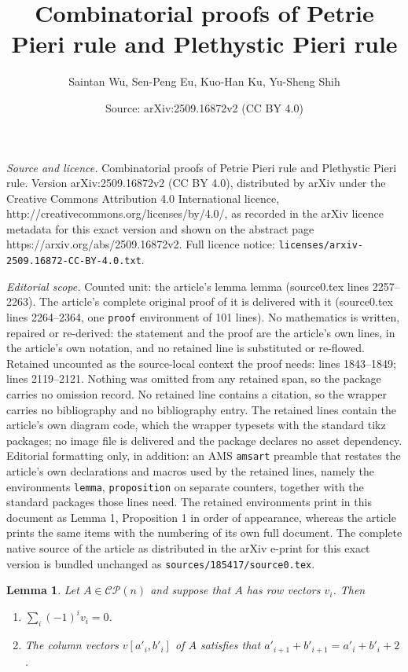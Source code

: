 \documentclass[10pt,a4paper]{amsart}
\title{Combinatorial proofs of Petrie Pieri rule and Plethystic Pieri rule}
\author{Saintan Wu, Sen-Peng Eu, Kuo-Han Ku, Yu-Sheng Shih}
\date{Source: arXiv:2509.16872v2 (CC BY 4.0)}
\newtheorem{lemma}{Lemma}
\begin{document}
\maketitle

\noindent\emph{Source and licence.} Combinatorial proofs of Petrie Pieri rule and Plethystic Pieri rule. Version arXiv:2509.16872v2 (CC BY 4.0), distributed by arXiv under the Creative Commons Attribution 4.0 International licence, http://creativecommons.org/licenses/by/4.0/, as recorded in the arXiv licence metadata for this exact version and shown on the abstract page https://arxiv.org/abs/2509.16872v2. Full licence notice: \texttt{licenses/arxiv-2509.16872-CC-BY-4.0.txt}.\par\smallskip

\noindent\textit{Editorial scope.} Counted unit: the article's lemma lemma (source0.tex lines 2257--2263). The article's complete original proof of it is delivered with it (source0.tex lines 2264--2364, one \texttt{proof} environment of 101 lines). No mathematics is written, repaired or re-derived: the statement and the proof are the article's own lines, in the article's own notation, and no retained line is substituted or re-flowed.  Retained uncounted as the source-local context the proof needs: lines 1843--1849; lines 2119--2121.  Nothing was omitted from any retained span, so the package carries no omission record.  No retained line contains a citation, so the wrapper carries no bibliography and no bibliography entry.  The retained lines contain the article's own diagram code, which the wrapper typesets with the standard tikz packages; no image file is delivered and the package declares no asset dependency.  Editorial formatting only, in addition: an AMS \texttt{amsart} preamble that restates the article's own declarations and macros used by the retained lines, namely the environments \texttt{lemma}, \texttt{proposition} on separate counters, together with the standard packages those lines need.  The retained environments print in this document as Lemma 1, Proposition 1 in order of appearance, whereas the article prints the same items with the numbering of its own full document.  The complete native source of the article as distributed in the arXiv e-print for this exact version is bundled unchanged as \texttt{sources/185417/source0.tex}.
        \begin{lemma}\label{lemma:cycleCaseLemma}
            Let $A\in \mathcal{CP}(n)$ and suppose that $A$ has row vectors $v_i$. Then 
            \begin{enumerate}
                \item $\sum_i (-1)^i v_i=0$.
                \item The column vectors $v[a'_i,b'_i]$ of $A$ satisfies that $a'_{i+1}+b'_{i+1}=a'_{i}+b'_{i}+2$.
            \end{enumerate}
        \end{lemma}
\end{document}
